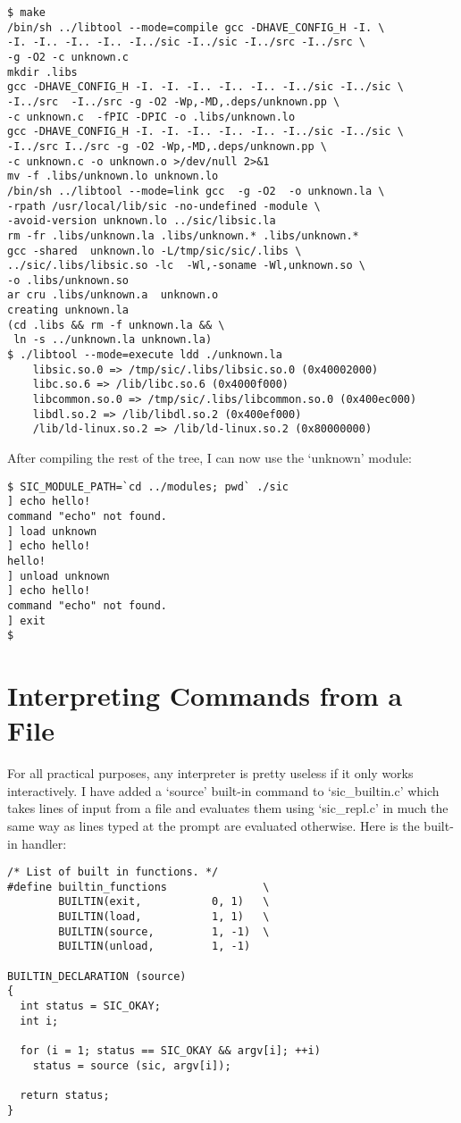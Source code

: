 \begin{Verbatim}[frame=single]
$ make
/bin/sh ../libtool --mode=compile gcc -DHAVE_CONFIG_H -I. \
-I. -I.. -I.. -I.. -I../sic -I../sic -I../src -I../src \   
-g -O2 -c unknown.c
mkdir .libs
gcc -DHAVE_CONFIG_H -I. -I. -I.. -I.. -I.. -I../sic -I../sic \
-I../src  -I../src -g -O2 -Wp,-MD,.deps/unknown.pp \
-c unknown.c  -fPIC -DPIC -o .libs/unknown.lo
gcc -DHAVE_CONFIG_H -I. -I. -I.. -I.. -I.. -I../sic -I../sic \
-I../src I../src -g -O2 -Wp,-MD,.deps/unknown.pp \
-c unknown.c -o unknown.o >/dev/null 2>&1
mv -f .libs/unknown.lo unknown.lo
/bin/sh ../libtool --mode=link gcc  -g -O2  -o unknown.la \
-rpath /usr/local/lib/sic -no-undefined -module \
-avoid-version unknown.lo ../sic/libsic.la
rm -fr .libs/unknown.la .libs/unknown.* .libs/unknown.*
gcc -shared  unknown.lo -L/tmp/sic/sic/.libs \
../sic/.libs/libsic.so -lc  -Wl,-soname -Wl,unknown.so \
-o .libs/unknown.so
ar cru .libs/unknown.a  unknown.o
creating unknown.la
(cd .libs && rm -f unknown.la && \
 ln -s ../unknown.la unknown.la)
$ ./libtool --mode=execute ldd ./unknown.la
    libsic.so.0 => /tmp/sic/.libs/libsic.so.0 (0x40002000)
    libc.so.6 => /lib/libc.so.6 (0x4000f000)
    libcommon.so.0 => /tmp/sic/.libs/libcommon.so.0 (0x400ec000)
    libdl.so.2 => /lib/libdl.so.2 (0x400ef000)
    /lib/ld-linux.so.2 => /lib/ld-linux.so.2 (0x80000000)
\end{Verbatim}

After compiling the rest of the tree, I can now use the `unknown' module:
 	
\begin{Verbatim}[frame=single]
$ SIC_MODULE_PATH=`cd ../modules; pwd` ./sic
] echo hello!
command "echo" not found.
] load unknown
] echo hello!
hello!
] unload unknown
] echo hello!
command "echo" not found.
] exit
$
\end{Verbatim}

\section{Interpreting Commands from a File}

For all practical purposes, any interpreter is pretty useless if it only works interactively. I have added a `source' built-in command to `sic\_{}builtin.c' which takes lines of input from a file and evaluates them using `sic\_{}repl.c' in much the same way as lines typed at the prompt are evaluated otherwise. Here is the built-in handler: 
 	
\begin{Verbatim}[frame=single]
/* List of built in functions. */
#define builtin_functions               \
        BUILTIN(exit,           0, 1)   \
        BUILTIN(load,           1, 1)   \
        BUILTIN(source,         1, -1)  \
        BUILTIN(unload,         1, -1)

BUILTIN_DECLARATION (source)
{
  int status = SIC_OKAY;
  int i;

  for (i = 1; status == SIC_OKAY && argv[i]; ++i)
    status = source (sic, argv[i]);

  return status;
}
\end{Verbatim}

